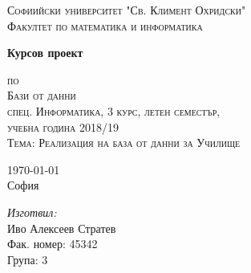 \documentclass[a4paper, 12pt, x11names]{article}
\newcommand{\univname}{Софиийски университет "Св. Климент Охридски"\\Факултет по математика и информатика}
\begin{document}
\begin{titlepage}
\begin{center}
    
\vspace*{.06\textheight}
{\scshape\large \univname\par}\vspace{1.5cm}

{\huge \bfseries{Курсов проект}\par}\vspace{0.7cm}
\textsc{\small по}\\[0.6cm]
\textsc{\Large Бази от данни}\\[0.5cm]
\textsc{\normalsize спец. Информатика, 3 курс, летен семестър,}\\[0.5cm]
\textsc{\normalsize учебна година 2018/19}\\[1.5cm]
\textsc{\Large Тема: Реализация на база от данни за Училище}\\[2cm]

\begin{minipage}[t]{0.4\textwidth}
\begin{flushleft} \large
{\large \today}\\[1cm]
София
\end{flushleft}
\end{minipage}
\begin{minipage}[t]{0.4\textwidth}
\begin{flushright} \large
\emph{Изготвил:}\\[0.5cm]
Иво Алексеев Стратев\\[0.5cm]
Фак. номер: 45342\\[0.2cm]
Група: 3
\end{flushright}
\end{minipage}
\end{center}
\end{titlepage}

\tableofcontents

\pagebreak
\end{document}
